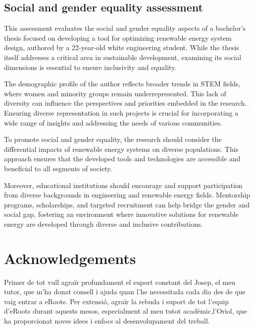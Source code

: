\documentclass[a4paper,11pt, titlepage, twoside]{article}
\begin{document}
\subsection{Social and gender equality assessment}

This assessment evaluates the social and gender equality aspects of a bachelor's thesis focused on developing a tool for optimizing renewable energy system design, authored by a 22-year-old white engineering student. While the thesis itself addresses a critical area in sustainable development, examining its social dimensions is essential to ensure inclusivity and equality.

The demographic profile of the author reflects broader trends in STEM fields, where women and minority groups remain underrepresented. This lack of diversity can influence the perspectives and priorities embedded in the research. Ensuring diverse representation in such projects is crucial for incorporating a wide range of insights and addressing the needs of various communities.

To promote social and gender equality, the research should consider the differential impacts of renewable energy systems on diverse populations. This approach ensures that the developed tools and technologies are accessible and beneficial to all segments of society.

Moreover, educational institutions should encourage and support participation from diverse backgrounds in engineering and renewable energy fields. Mentorship programs, scholarships, and targeted recruitment can help bridge the gender and social gap, fostering an environment where innovative solutions for renewable energy are developed through diverse and inclusive contributions.


\section*{Acknowledgements}

Primer de tot vull agraïr profundament el suport constant del Josep, el meu tutor, que m'ha donat consell i ajuda quan
l'he necessitada cada dia des de que vaig entrar a eRoots. Per extensió, agraïr la rebuda i suport de tot l'equip d'eRoots durant aquests mesos,
especialment al meu tutot acadèmic,l'Oriol, que ha proporcionat noves idees i enfocs al desenvolupament del treball.\par
\end{document}
